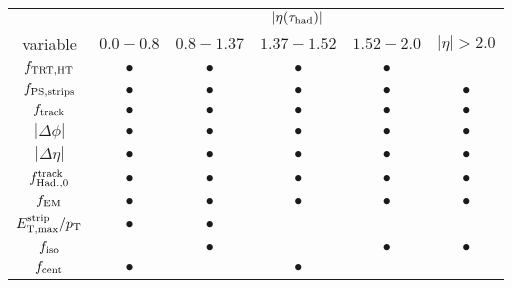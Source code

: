 \begin{tabular}{c|ccccc}
                       & \multicolumn{5}{c}{$|\eta(\tauh)|$} \\
  variable             & $0.0 - 0.8$ & $0.8 - 1.37$ & $1.37 - 1.52$ & $1.52 - 2.0$ & $ |\eta| > 2.0$ \\
  \hline
  $f_\mathrm{TRT,HT}$         & $\bullet$   & $\bullet$    & $\bullet$     & $\bullet$    &                 \\
  $f_\mathrm{PS,strips}$       & $\bullet$   & $\bullet$    & $\bullet$     & $\bullet$    & $\bullet$       \\
  $f_\mathrm{track}$  & $\bullet$   & $\bullet$    & $\bullet$     & $\bullet$    & $\bullet$       \\
  $|\Delta\phi|$       & $\bullet$   & $\bullet$    & $\bullet$     & $\bullet$    & $\bullet$       \\
  $|\Delta\eta|$       & $\bullet$   & $\bullet$    & $\bullet$     & $\bullet$    & $\bullet$       \\
  $f_\mathrm{Had.,0}^{\mathrm{track}}$         & $\bullet$   & $\bullet$    & $\bullet$     & $\bullet$    & $\bullet$       \\
  $f_\mathrm{EM}$            & $\bullet$   & $\bullet$    & $\bullet$     & $\bullet$    & $\bullet$       \\
  $E_\mathrm{T,max}^\mathrm{strip}/p_{\mathrm{T}}$     & $\bullet$   & $\bullet$    &               &              &                 \\
  $f_\mathrm{iso}$           &             & $\bullet$    &               & $\bullet$    & $\bullet$       \\
  $f_\mathrm{cent}$    & $\bullet$   &              & $\bullet$     &              &                 \\
\end{tabular}

